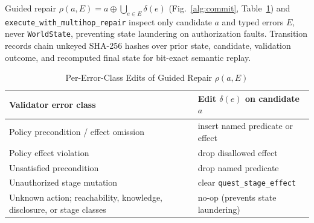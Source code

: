 Guided repair $\rho(a,E)=a\oplus\bigcup_{e\in E}\delta(e)$ (Fig.~\ref{alg:commit}, Table~\ref{tab:rho-rules}) and \texttt{execute\_\allowbreak with\_\allowbreak multihop\_\allowbreak repair} inspect only candidate $a$ and typed errors $E$, never \texttt{WorldState}, preventing state laundering on authorization faults. Transition records chain unkeyed SHA-256 hashes over prior state, candidate, validation outcome, and recomputed final state for bit-exact semantic replay.

\begin{table}[!tbp]
\caption{Per-Error-Class Edits of Guided Repair $\rho(a,E)$}
\label{tab:rho-rules}
\centering
\footnotesize
\begin{tabularx}{\columnwidth}{@{}>{\raggedright\arraybackslash}X>{\raggedright\arraybackslash}X@{}}
\toprule
\textbf{Validator error class} & \textbf{Edit $\delta(e)$ on candidate $a$} \\
\midrule
Policy precondition / effect omission & insert named predicate or effect \\
Policy effect violation & drop disallowed effect \\
Unsatisfied precondition & drop named predicate \\
Unauthorized stage mutation & clear \texttt{quest\_stage\_effect} \\
Unknown action; reachability, knowledge, disclosure, or stage classes & no-op (prevents state laundering) \\
\bottomrule
\end{tabularx}
\end{table}
